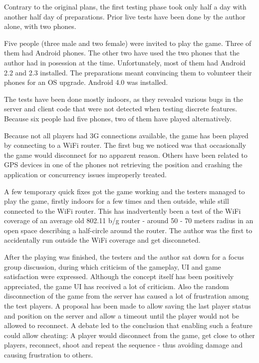 Contrary to the original plans, the first testing phase took only half a day
with another half day of preparations. Prior live tests have been done by the
author alone, with two phones.\newline

Five people (three male and two female) were invited to play the game. Three of
them had Android phones. The other two have used the two phones that the author
had in posession at the time. Unfortunately, most of them had Android 2.2 and
2.3 installed. The preparations meant convincing them to volunteer their phones
for an OS upgrade. Android 4.0 was installed.\newline

The tests have been done mostly indoors, as they revealed various bugs in the
server and client code that were not detected when testing discrete features.
Because six people had five phones, two of them have played
alternatively.\newline

Because not all players had 3G connections available, the game has been played
by connecting to a WiFi router. The first bug we noticed was that occasionally
the game would disconnect for no apparent reason. Others have been related to
GPS devices in one of the phones not retrieving the position and crashing the
application or concurrency issues improperly treated.\newline

A few temporary quick fixes got the game working and the testers managed to play
the game, firstly indoors for a few times and then outside, while still
connected to the WiFi router. This has inadvertently been a test of the WiFi
coverage of an average old 802.11 b/g router - around 50 - 70 meters radius in
an open space describing a half-circle around the router. The author was the
first to accidentally run outside the WiFi coverage and get disconneted.\newline

After the playing was finished, the testers and the author sat down for a
focus group discussion, during which criticism of the gameplay, UI and game
satisfaction were expressed. Although the concept itself has been positively
appreciated, the game UI has received a lot of criticism. Also the random
disconnection of the game from the server has caused a lot of frustration among
the test players. A proposal has been made to allow saving the last player
status and position on the server and allow a timeout until the player would not
be allowed to reconnect. A debate led to the conclusion that enabling such a
feature could allow cheating: A player would disconnect from the game, get close
to other players, reconnect, shoot and repeat the sequence - thus avoiding
damage and causing frustration to others. \newline

